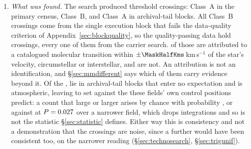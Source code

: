 \begin{enumerate}[leftmargin=1.6em,itemsep=4pt,topsep=4pt,parsep=0pt]
\item \emph{What was found.} The search produced \EvNCrossRaw{} threshold
crossings: \CkNCrossCenA{} Class~A in the primary census, \PrFlagXrossWord{}
Class~B, and \CeNTailCrossWord{} Class~A in archival-tail blocks. All
\PrFlagXrossWord{} Class~B crossings come from the single execution block
that fails the data-quality criterion of Appendix~\ref{sec:blockquality}, so
the quality-passing data hold \EvNCrossQp{} crossings, every one of them from
the carrier search. \EvNAttrQp{} of those are attributed to a
catalogued molecular transition within $\pm\MaskHalfKms$\,km\,s$^{-1}$ of the
star's velocity, circumstellar or interstellar, and \EvNUnattrQp{} are not.
An attribution is not an identification, and \S\ref{sec:mmdifferent} says which of them carry
evidence beyond it. Of the \EvNUnattrQp{}, \CeNTailCrossWord{} lie in
archival-tail blocks that enter no expectation and \CeTlObsCutWord{} is
atmospheric, leaving \CeObs{} to set against the \CeExp{} these fields' own
control positions predict: a count that large or larger arises by chance with
probability \CeProbNull, or \FrNarrowObs{} against \FrNarrowExp{} at
$P=0.027$ over a narrower field, which drops integrations and so is
not the statistic \S\ref{sec:statistic} defines. Either way this is
consistency and not a demonstration that the crossings are noise, since a
further \CeAddLim{} would have been consistent too, \FrNarrowAddLim{} on the
narrower reading (\S\ref{sec:technosearch}, \S\ref{sec:trigunif}).


\end{enumerate}
